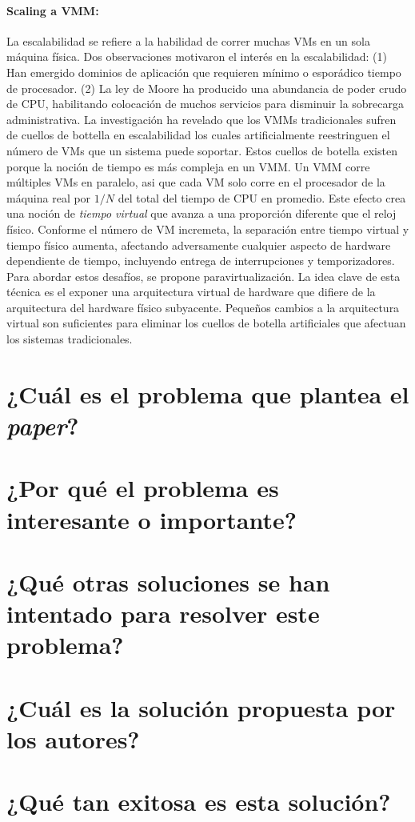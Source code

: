 \paragraph{\textnormal{\textbf{Scaling a VMM:}}}  
La escalabilidad se refiere a la habilidad de correr muchas VMs en un sola máquina física. Dos observaciones motivaron el interés en la escalabilidad: (1) Han emergido dominios de aplicación que requieren mínimo o esporádico tiempo de procesador. (2) La ley de Moore ha producido una abundancia de poder crudo de CPU, habilitando colocación de muchos servicios para disminuir la sobrecarga administrativa. La investigación ha revelado que los VMMs tradicionales sufren de cuellos de bottella en escalabilidad los cuales artificialmente reestringuen el número de VMs que un sistema puede soportar. Estos cuellos de botella existen porque la noción de tiempo es más compleja en un VMM. Un VMM corre múltiples VMs en paralelo, asi que cada VM solo corre en el procesador de la máquina real por $1/N$ del total del tiempo de CPU en promedio. Este efecto crea una noción de \emph{tiempo virtual} que avanza a una proporción diferente que el reloj físico. Conforme el número de VM incremeta, la separación entre tiempo virtual y tiempo físico aumenta, afectando adversamente cualquier aspecto de hardware dependiente de tiempo, incluyendo entrega de interrupciones y temporizadores. Para abordar estos desafíos, se propone paravirtualización. La idea clave de esta técnica es el exponer una arquitectura virtual de hardware que difiere de la arquitectura del hardware físico subyacente. Pequeños cambios a la arquitectura virtual son suficientes para eliminar los cuellos de botella artificiales que afectuan los sistemas tradicionales.  


\section{¿Cuál es el problema que plantea el \textit{paper}?}

\section{¿Por qué el problema es interesante o importante?}

\section{¿Qué otras soluciones se han intentado para resolver este problema?}
     
\section{¿Cuál es la solución propuesta por los autores?}

\section{¿Qué tan exitosa es esta solución?} 